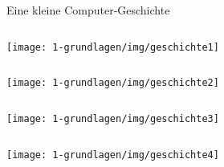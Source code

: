 \begin{frame}[allowframebreaks]{Eine kleine Computer-Geschichte}
    \begin{columns}
        \column{\dimexpr\paperwidth-10pt}
        \texttt{[image: 1-grundlagen/img/geschichte1]}
    \end{columns}

    \begin{columns}
        \column{\dimexpr\paperwidth-10pt}
        \texttt{[image: 1-grundlagen/img/geschichte2]}
    \end{columns}

    \begin{columns}
        \column{\dimexpr\paperwidth-10pt}
        \texttt{[image: 1-grundlagen/img/geschichte3]}
    \end{columns}

    \begin{columns}
        \column{\dimexpr\paperwidth-10pt}
        \texttt{[image: 1-grundlagen/img/geschichte4]}
    \end{columns}
\end{frame}

